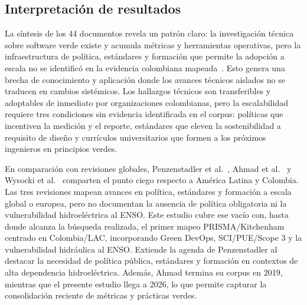 \documentclass[conference]{IEEEtran}
\begin{document}
\subsection{Interpretaci\'on de resultados}\label{sec:interp}
La s\'intesis de los 44 documentos revela un patr\'on claro: la investigaci\'on t\'ecnica sobre software verde existe y acumula m\'etricas y herramientas operativas, pero la infraestructura de pol\'itica, est\'andares y formaci\'on que permite la adopci\'on a escala no se identific\'o en la evidencia colombiana mapeada~\cite{bossa2023}. Esto genera una brecha de conocimiento y aplicaci\'on donde los avances t\'ecnicos aislados no se traducen en cambios sist\'emicos. Los hallazgos t\'ecnicos son transferibles y adoptables de inmediato por organizaciones colombianas, pero la escalabilidad requiere tres condiciones sin evidencia identificada en el corpus: pol\'iticas que incentiven la medici\'on y el reporte, est\'andares que eleven la sostenibilidad a requisito de diseño y curr\'iculos universitarios que formen a los pr\'oximos ingenieros en principios verdes.

En comparaci\'on con revisiones globales, Penzenstadler et al.~\cite{penzenstadler2014}, Ahmad et al.~\cite{ahmad2021} y Wysocki et al.~\cite{wysocki2025} comparten el punto ciego respecto a Am\'erica Latina y Colombia. Las tres revisiones mapean avances en pol\'itica, est\'andares y formaci\'on a escala global o europea, pero no documentan la ausencia de pol\'itica obligatoria ni la vulnerabilidad hidroel\'ectrica al ENSO. Este estudio cubre ese vac\'io con, hasta donde alcanza la b\'usqueda realizada, el primer mapeo PRISMA/Kitchenham centrado en Colombia/LAC, incorporando Green DevOps, SCI/PUE/Scope 3 y la vulnerabilidad hidr\'aulica al ENSO. Extiende la agenda de Penzenstadler al destacar la necesidad de pol\'itica p\'ublica, est\'andares y formaci\'on en contextos de alta dependencia hidroel\'ectrica. Adem\'as, Ahmad termina su corpus en 2019, mientras que el presente estudio llega a 2026, lo que permite capturar la consolidaci\'on reciente de m\'etricas y pr\'acticas verdes.
\end{document}
